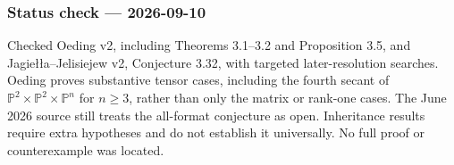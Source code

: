 \documentclass[11pt,a4paper]{article}
\begin{document}
\subsubsection{Status check ---
2026-09-10}\label{status-check-2026-09-10}

Checked Oeding v2, including Theorems 3.1--3.2 and Proposition 3.5, and
Jagiełła--Jelisiejew v2, Conjecture 3.32, with targeted later-resolution
searches. Oeding proves substantive tensor cases, including the fourth
secant of \(\mathbb P^2\times\mathbb P^2\times\mathbb P^n\) for
\(n\ge3\), rather than only the matrix or rank-one cases. The June 2026
source still treats the all-format conjecture as open. Inheritance
results require extra hypotheses and do not establish it universally. No
full proof or counterexample was located.
\end{document}
